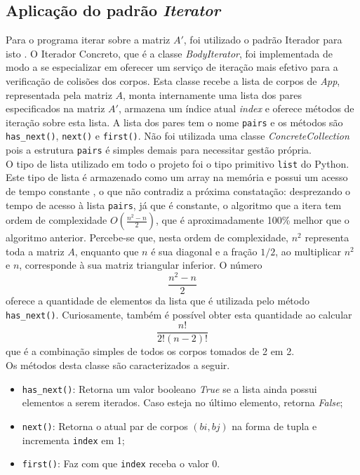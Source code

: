 \documentclass[11pt]{article}
\begin{document}
\subsection{Aplicação do padrão \textit{Iterator}}

Para o programa iterar sobre a matriz $A'$, foi utilizado o padrão Iterador para isto \cite{refac_guru_iter}. O Iterador Concreto, que é a classe \textit{BodyIterator}, foi implementada de modo a se especializar em oferecer um serviço de iteração mais efetivo para a verificação de colisões dos corpos. Esta classe recebe a lista de corpos de \textit{App}, representada pela matriz $A$, monta internamente uma lista dos pares especificados na matriz $A'$, armazena um índice atual \textit{index} e oferece métodos de iteração sobre esta lista. A lista dos pares tem o nome \verb|pairs| e os métodos são \verb|has_next()|, \verb|next()| e \verb|first()|. Não foi utilizada uma classe \textit{ConcreteCollection} pois a estrutura \verb|pairs| é simples demais para necessitar gestão própria. \\

O tipo de lista utilizado em todo o projeto foi o tipo primitivo \verb|list| do Python. Este tipo de lista é armazenado como um array na memória e possui um acesso de tempo constante \cite{time_complexity}, o que não contradiz a próxima constatação: desprezando o tempo de acesso à lista \verb|pairs|, já que é constante, o algoritmo que a itera tem ordem de complexidade $O(\frac{n^2 - n}{2})$, que é aproximadamente 100\% melhor que o algoritmo anterior. Percebe-se que, nesta ordem de complexidade, $n^2$ representa toda a matriz $A$, enquanto que $n$ é sua diagonal e a fração $1/2$, ao multiplicar $n^2$ e $n$, corresponde à sua matriz triangular inferior. O número
$$\frac{n^2 - n}{2}$$
oferece a quantidade de elementos da lista que é utilizada pelo método \verb|has_next()|. Curiosamente, também é possível obter esta quantidade ao calcular 
$$\frac{n!}{2!(n-2)!}$$
que é a combinação simples de todos os corpos tomados de 2 em 2. \\

Os métodos desta classe são caracterizados a seguir.

\begin{itemize}
    \item \verb|has_next()|: Retorna um valor booleano \textit{True} se a lista ainda possui elementos a serem iterados. Caso esteja no último elemento, retorna \textit{False};
    \item \verb|next()|: Retorna o atual par de corpos $(bi, bj)$ na forma de tupla e incrementa \verb|index| em 1;
    \item \verb|first()|: Faz com que \verb|index| receba o valor 0.
\end{itemize}
\end{document}
